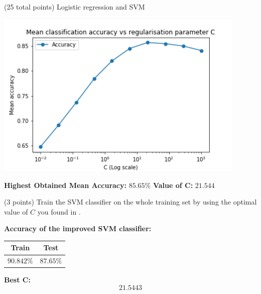 \documentclass[12pt]{article}
\begin{document}
\begin{question}{(25 total points) Logistic regression and SVM}
\begin{subquestion}
      \begin{answerbox}{30em}
        \begin{center}
            \includegraphics[width=0.9\textwidth]{results/2_5.png}    
        \end{center}
        \textbf{Highest Obtained Mean Accuracy: } $85.65\%$
        \newline
        \textbf{Value of C: } $21.544$
      \end{answerbox}
  


   \end{subquestion}
   \begin{subquestion}{(3 points)
       Train the SVM classifier on the whole training set by using the
       optimal value of $C$ you found in . 
     } \label{Q2.6}


       

      \begin{answerbox}{10em}
        \textbf{Accuracy of the improved SVM classifier:}
        \medskip
        \begin{center}
            \begin{tabular}{c|c}
            \toprule
              Train & Test \\ \hline
              $90.842\%$ & $87.65\%$ \\
            \bottomrule
         \end{tabular}
        \end{center}
        \textbf{Best C: }
            $$21.5443$$
      \end{answerbox}
  


   \end{subquestion}
%
%

\end{question}
\clearpage
%
%
\end{document}

